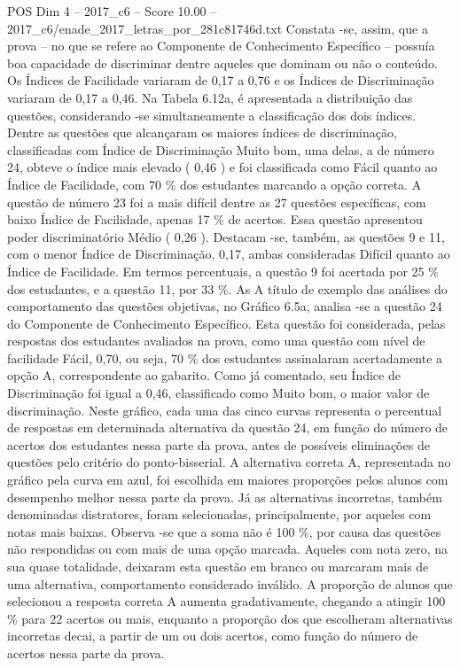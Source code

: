 \begin{textsample}{POS Dim 4 – 2017\_c6 – Score 10.00 – 2017\_c6/enade\_2017\_letras\_por\_281c81746d.txt}
Constata -se, assim, que a prova – no que se refere ao Componente de Conhecimento Específico – possuía boa capacidade de discriminar dentre aqueles que dominam ou não o conteúdo.
Os Índices de Facilidade variaram de 0,17 a 0,76 e os Índices de Discriminação variaram de 0,17 a 0,46.
Na Tabela 6.12a, é apresentada a distribuição das questões, considerando -se simultaneamente a classificação dos dois índices.
Dentre as questões que alcançaram os maiores índices de discriminação, classificadas com Índice de Discriminação Muito bom, uma delas, a de número 24, obteve o índice mais elevado ( 0,46 ) e foi classificada como Fácil quanto ao Índice de Facilidade, com 70 \% dos estudantes marcando a opção correta.
A questão de número 23 foi a mais difícil dentre as 27 questões específicas, com baixo Índice de Facilidade, apenas 17 \% de acertos.
Essa questão apresentou poder discriminatório Médio ( 0,26 ).
Destacam -se, também, as questões 9 e 11, com o menor Índice de Discriminação, 0,17, ambas consideradas Difícil quanto ao Índice de Facilidade.
Em termos percentuais, a questão 9 foi acertada por 25 \% dos estudantes, e a questão 11, por 33 \%.
As A título de exemplo das análises do comportamento das questões objetivas, no Gráfico 6.5a, analisa -se a questão 24 do Componente de Conhecimento Específico.
Esta questão foi considerada, pelas respostas dos estudantes avaliados na prova, como uma questão com nível de facilidade Fácil, 0,70, ou seja, 70 \% dos estudantes assinalaram acertadamente a opção A, correspondente ao gabarito.
Como já comentado, seu Índice de Discriminação foi igual a 0,46, classificado como Muito bom, o maior valor de discriminação.
Neste gráfico, cada uma das cinco curvas representa o percentual de respostas em determinada alternativa da questão 24, em função do número de acertos dos estudantes nessa parte da prova, antes de possíveis eliminações de questões pelo critério do ponto-bisserial.
A alternativa correta A, representada no gráfico pela curva em azul, foi escolhida em maiores proporções pelos alunos com desempenho melhor nessa parte da prova.
Já as alternativas incorretas, também denominadas distratores, foram selecionadas, principalmente, por aqueles com notas mais baixas.
Observa -se que a soma não é 100 \%, por causa das questões não respondidas ou com mais de uma opção marcada.
Aqueles com nota zero, na sua quase totalidade, deixaram esta questão em branco ou marcaram mais de uma alternativa, comportamento considerado inválido.
A proporção de alunos que selecionou a resposta correta A aumenta gradativamente, chegando a atingir 100 \% para 22 acertos ou mais, enquanto a proporção dos que escolheram alternativas incorretas decai, a partir de um ou dois acertos, como função do número de acertos nessa parte da prova.

\end{textsample}

